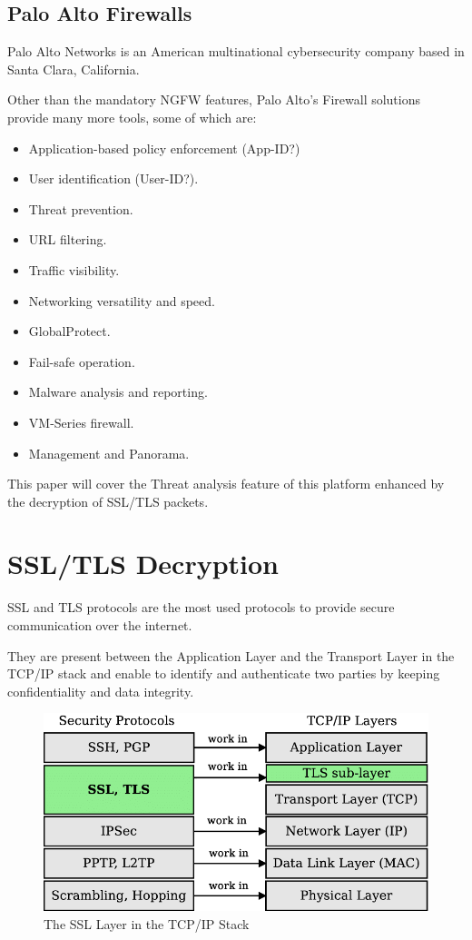 \documentclass[status=normal,cover=tesi,language=en]{gmeepd}
\begin{document}
\pagebreak

\subsection{Palo Alto Firewalls}

Palo Alto Networks is an American multinational cybersecurity company based in Santa Clara, California.

Other than the mandatory NGFW features, Palo Alto's Firewall solutions provide many more tools, some of which are\cite{panos-features}:

\begin{itemize}
    \item Application-based policy enforcement (App-ID?)
    \item User identification (User-ID?).
    \item Threat prevention.
    \item URL filtering.
    \item Traffic visibility.
    \item Networking versatility and speed.
    \item GlobalProtect.
    \item Fail-safe operation.
    \item Malware analysis and reporting.
    \item VM-Series firewall.
    \item Management and Panorama.
\end{itemize}

This paper will cover the Threat analysis feature of this platform enhanced by the decryption of SSL/TLS packets.

\pagebreak

\section{SSL/TLS Decryption}

SSL and TLS protocols are the most used protocols to provide secure communication over the internet.

They are present between the Application Layer and the Transport Layer in the TCP/IP stack and enable to identify and authenticate two parties by keeping confidentiality and data integrity.

\begin{figure}[!hb]
    \centering
    \includegraphics[width=13cm]{img/ssl-stack.png}
    \caption{The SSL Layer in the TCP/IP Stack}
    \label{SSL Layer}
\end{figure}
\end{document}
